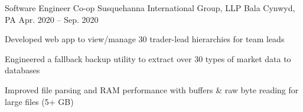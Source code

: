 \begin{cventries}
  \cventry
  {Software Engineer Co-op} %
  {Susquehanna International Group, LLP} %
  {Bala Cynwyd, PA} %
  {Apr. 2020 -- Sep. 2020} %
  {
    \begin{cvitems} %
      \item {Developed web app to view/manage 30 trader-lead hierarchies for team leads}
      \item {Engineered a fallback backup utility to extract over 30 types of market data to databases}
      \item {Improved file parsing and RAM performance with buffers \& raw byte reading for large files (5+ GB)}
    \end{cvitems}
  }


\end{cventries}
